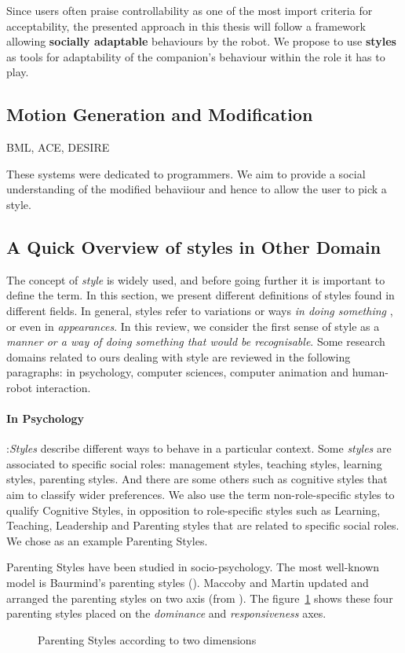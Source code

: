 \documentclass[a4paper,twocolumn]{svjour3}
\begin{document}
Since users often praise controllability as one of the most import criteria for acceptability, the presented approach in this thesis will follow a framework allowing \textbf{socially adaptable} behaviours by the robot.
We propose to use \textbf{styles} as tools for adaptability of the companion's behaviour within the role it has to play.

\subsection{Motion Generation and Modification}
BML, 
ACE, DESIRE

These systems were dedicated to programmers. 
We aim to provide a social understanding of the modified behaviiour and hence to allow the user to pick a style.

\subsection{A Quick Overview of styles in Other Domain}
\label{sec:soa_styles}
The concept of \textit{style} is widely used, and before going further it is important to define the term. 
In this section, we present different definitions of  styles found in  different fields.
In general,  styles refer to variations or ways  \textit{in doing something }, or even in \textit{appearances}.
In this review, we consider the first sense of style as a\textit{ manner or a way of doing something that would be recognisable}.
Some research domains related to ours dealing with style are reviewed in the following paragraphs: in psychology, computer sciences, computer animation and  human-robot interaction. 

\paragraph{In Psychology}:\textit{Styles} describe different ways to behave in a particular context. 
Some \textit{styles} are associated to specific social roles: management styles, teaching styles, learning styles, parenting styles. 
And there are some others such as cognitive styles that aim to classify wider preferences.
We also use the term non-role-specific styles to qualify Cognitive Styles, in opposition to role-specific styles such as  Learning, Teaching, Leadership and Parenting styles that are related to specific social roles. 
We chose as an example Parenting Styles.

Parenting Styles have been studied in socio-psychology. 
The most well-known model is Baurmind's parenting styles (\cite{baumrind1991influence}).
Maccoby and Martin updated and arranged  the parenting styles on two axis (from \cite{Darling1993}). 
The figure~\ref{fig:fpareting_style} shows these four parenting styles placed on the \textit{ dominance} and \textit{responsiveness} axes.
\begin{figure}[h]
	\centering
	\caption{Parenting Styles according to two dimensions}
	\label{fig:fpareting_style}
\end{figure}
\end{document}
